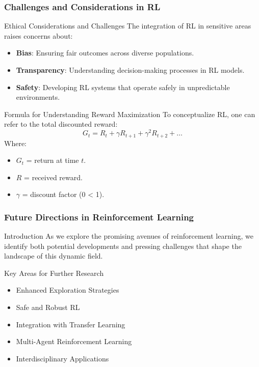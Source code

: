 \documentclass{beamer}
\begin{document}
\begin{frame}[fragile]
    \frametitle{Challenges and Considerations in RL}
    \begin{block}{Ethical Considerations and Challenges}
    The integration of RL in sensitive areas raises concerns about:
    \begin{itemize}
        \item \textbf{Bias}: Ensuring fair outcomes across diverse populations.
        \item \textbf{Transparency}: Understanding decision-making processes in RL models.
        \item \textbf{Safety}: Developing RL systems that operate safely in unpredictable environments.
    \end{itemize}
    \end{block}

    \begin{block}{Formula for Understanding Reward Maximization}
    To conceptualize RL, one can refer to the total discounted reward:
    \begin{equation}
    G_t = R_t + \gamma R_{t+1} + \gamma^2 R_{t+2} + \ldots 
    \end{equation}
    Where:
    \begin{itemize}
        \item \( G_t \) = return at time \( t \).
        \item \( R \) = received reward.
        \item \( \gamma \) = discount factor (0 \leq \gamma < 1).
    \end{itemize}
    \end{block}
\end{frame}

\begin{frame}[fragile]
    \frametitle{Future Directions in Reinforcement Learning}
    \begin{block}{Introduction}
        As we explore the promising avenues of reinforcement learning, we identify both potential developments and pressing challenges that shape the landscape of this dynamic field.
    \end{block}
    \begin{block}{Key Areas for Further Research}
        \begin{itemize}
            \item Enhanced Exploration Strategies
            \item Safe and Robust RL
            \item Integration with Transfer Learning
            \item Multi-Agent Reinforcement Learning
            \item Interdisciplinary Applications
        \end{itemize}
    \end{block}
\end{frame}
\end{document}
